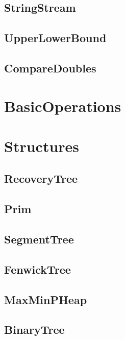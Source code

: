 \subsection{ StringStream}
\raggedbottom
\hrulefill
\subsection{ UpperLowerBound}
\raggedbottom
\hrulefill
\subsection{ CompareDoubles}
\raggedbottom
\hrulefill

\section{BasicOperations}

\section{Structures}
\subsection{ RecoveryTree}
\raggedbottom
\hrulefill
\subsection{ Prim}
\raggedbottom
\hrulefill
\subsection{ SegmentTree}
\raggedbottom
\hrulefill
\subsection{ FenwickTree}
\raggedbottom
\hrulefill
\subsection{ MaxMinPHeap}
\raggedbottom
\hrulefill
\subsection{ BinaryTree}
\raggedbottom
\hrulefill

